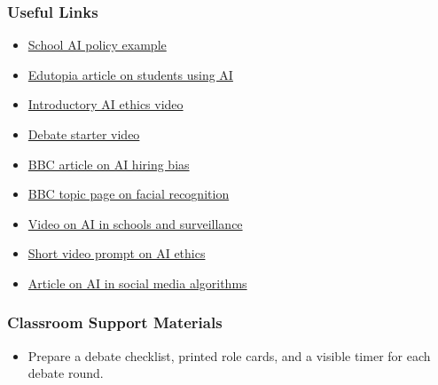 \documentclass[11pt, a4paper]{article}
\begin{document}
\subsubsection*{Useful Links}
\begin{itemize}
    \item \href{https://www.flintk12.com/ai-policies?gad_source=1&gad_campaignid=22259427801&gbraid=0AAAAA-MG5Y5FYAP6jtmpzvq5wrty35uvO&gclid=CjwKCAjw6s7CBhACEiwAuHQckmAfjy8fRE4HdDxcHh3u-JP4OrxhyUby6MRt7Va0Rd4n2AlSvF_DZxoC-i4QAvD_BwE}{School AI policy example}
    \item \href{https://www.edutopia.org/article/how-students-use-ai-pbl-units?gad_source=1&gad_campaignid=21692035626&gbraid=0AAAAAD27_M-Exmcr24H4-s02IBe8jBZfW&gclid=CjwKCAjw6s7CBhACEiwAuHQckhCTqhcEwegR2dcQACayHzIK2qXDll7iMxLvzEQOVuZquXDKPCwC4xoCNM4QAvD_BwE}{Edutopia article on students using AI}
    \item \href{https://www.youtube.com/watch?v=G1IsZeFR_Rk}{Introductory AI ethics video}
    \item \href{https://www.youtube.com/watch?v=m8vQ14U1y5g}{Debate starter video}
    \item \href{https://www.bbc.com/worklife/article/20240214-ai-recruiting-hiring-software-bias-discrimination}{BBC article on AI hiring bias}
    \item \href{https://www.bbc.com/news/topics/c90ymkd8lglt}{BBC topic page on facial recognition}
    \item \href{https://www.youtube.com/watch?v=JMLsHI8aV0g&t=187s}{Video on AI in schools and surveillance}
    \item \href{https://youtube.com/shorts/yldu94eNKiE?si=qnqyPpk3cEW9vIYp}{Short video prompt on AI ethics}
    \item \href{https://techround.co.uk/tech/what-are-the-implications-of-ai-in-social-media-algorithms}{Article on AI in social media algorithms}
\end{itemize}

\subsubsection*{Classroom Support Materials}
\begin{itemize}
    \item Prepare a debate checklist, printed role cards, and a visible timer for each debate round.
\end{itemize}

\end{document}
